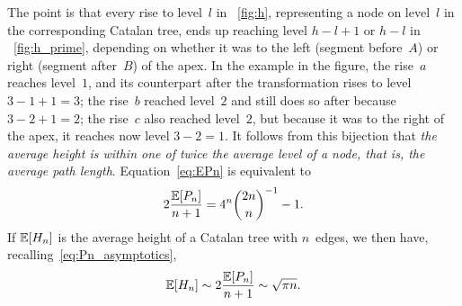 The point is that every rise to level~\(l\) in \fig~\ref{fig:h},
representing a node on level~\(l\) in the corresponding Catalan tree,
ends up reaching level $h-l+1$ or $h-l$ in \fig~\ref{fig:h_prime},
depending on whether it was to the left (segment before~$A$) or right
(segment after~$B$) of the apex.  In the example in the figure, the
rise~$a$ reaches level~$1$, and its counterpart after the
transformation rises to level \(3-1+1=3\); the rise~$b$ reached
level~$2$ and still does so after because \(3-2+1=2\); the rise~$c$
also reached level~$2$, but because it was to the right of the apex,
it reaches now level \(3-2=1\). It follows from this bijection that
\emph{the average height is within one of twice the average level of a
node, that is, the average path length}. Equation~\eqref{eq:EPn} is
equivalent to
\begin{equation*}
2\frac{\mathbb{E}[{P_n}]}{n+1} = 4^{n}\binom{2n}{n}^{-1} - 1.
\end{equation*}
If \(\mathbb{E}[{H_n}]\) is the average height of a Catalan tree with
\(n\)~edges, we then have, recalling~\eqref{eq:Pn_asymptotics},
\begin{equation*}
\mathbb{E}[{H_n}] \sim 2\frac{\mathbb{E}[{P_n}]}{n+1} \sim \sqrt{\pi n}.
\end{equation*}
